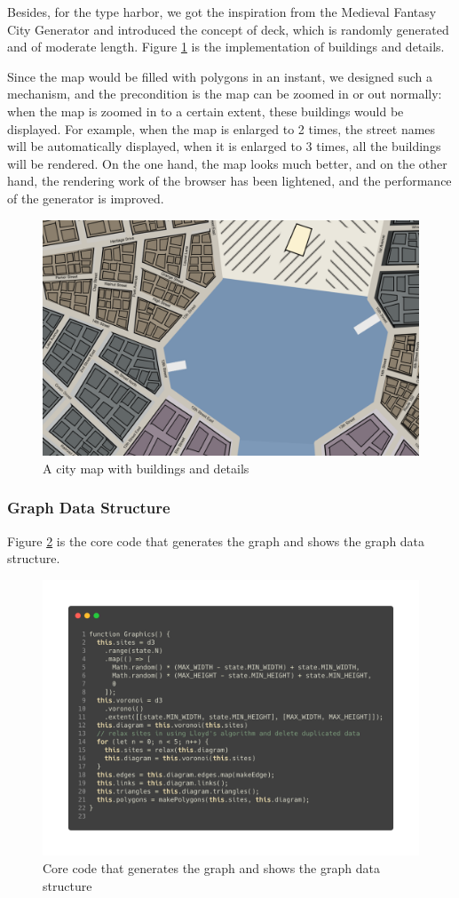 Besides, for the type harbor, we got the inspiration from the Medieval Fantasy City Generator and introduced the concept of deck, which is randomly generated and of moderate length. Figure \ref{fig:buildings} is the implementation of buildings and details.

Since the map would be filled with polygons in an instant, we designed such a mechanism, and the precondition is the map can be zoomed in or out normally: when the map is zoomed in to a certain extent, these buildings would be displayed. For example, when the map is enlarged to 2 times, the street names will be automatically displayed, when it is enlarged to 3 times, all the buildings will be rendered. On the one hand, the map looks much better, and on the other hand, the rendering work of the browser has been lightened, and the performance of the generator is improved.


\begin{figure}[htbp]
  \includegraphics[width=\textwidth]{section04/assets/Map-details.png}
  \caption{A city map with buildings and details}
  \label{fig:buildings}
\end{figure}

\subsubsection{Graph Data Structure}

Figure \ref{fig:Code graph} is the core code that generates the graph and shows the graph data structure.

\begin{figure}[htbp]
  \includegraphics[width=\textwidth]{section04/assets/Code-graph.png}
  \caption{Core code that generates the graph and shows the graph data structure}
  \label{fig:Code graph}
\end{figure}
